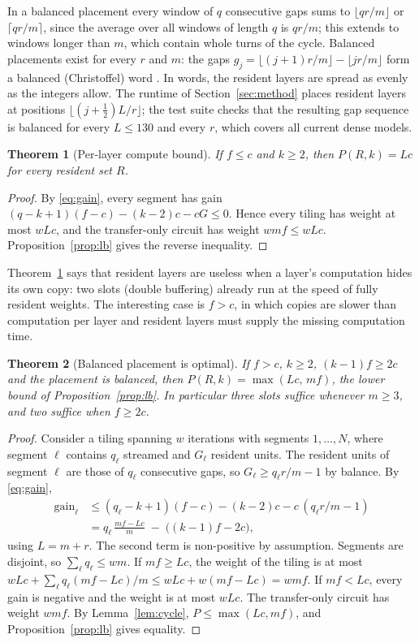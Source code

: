 \documentclass[final,5p,times,twocolumn]{elsarticle}
\newtheorem{theorem}{Theorem}
\theoremstyle{definition}
\newcommand{\Res}{R}
\newcommand{\per}{P}
\begin{document}
In a balanced placement every window of $q$ consecutive gaps sums to $\lfloor qr/m\rfloor$ or $\lceil qr/m\rceil$, since the average over all windows of length $q$ is $qr/m$; this extends to windows longer than $m$, which contain whole turns of the cycle. Balanced placements exist for every $r$ and $m$: the gaps $g_j=\lfloor (j+1)r/m\rfloor-\lfloor jr/m\rfloor$ form a balanced (Christoffel) word \cite[Ch.~2]{lothaire2002algebraic}. In words, the resident layers are spread as evenly as the integers allow. The runtime of Section~\ref{sec:method} places resident layers at positions $\lfloor (j+\frac12)L/r\rfloor$; the test suite checks that the resulting gap sequence is balanced for every $L\le130$ and every $r$, which covers all current dense models.

\begin{theorem}[Per-layer compute bound]\label{thm:compute}
If $f\le c$ and $k\ge2$, then $\per(\Res,k)=Lc$ for every resident set $\Res$.
\end{theorem}
\begin{proof}
By \eqref{eq:gain}, every segment has gain $(q-k+1)(f-c)-(k-2)c-cG\le0$. Hence every tiling has weight at most $wLc$, and the transfer-only circuit has weight $wmf\le wLc$. Proposition~\ref{prop:lb} gives the reverse inequality.
\end{proof}

Theorem~\ref{thm:compute} says that resident layers are useless when a layer's computation hides its own copy: two slots (double buffering) already run at the speed of fully resident weights. The interesting case is $f>c$, in which copies are slower than computation per layer and resident layers must supply the missing computation time.

\begin{theorem}[Balanced placement is optimal]\label{thm:balanced}
If $f>c$, $k\ge 2$, $(k-1)f\ge 2c$ and the placement is balanced, then $\per(\Res,k)=\max(Lc,\,mf)$, the lower bound of Proposition~\ref{prop:lb}. In particular three slots suffice whenever $m\ge3$, and two suffice when $f\ge 2c$.
\end{theorem}
\begin{proof}
Consider a tiling spanning $w$ iterations with segments $1,\dots,N$, where segment $\ell$ contains $q_\ell$ streamed and $G_\ell$ resident units. The resident units of segment $\ell$ are those of $q_\ell$ consecutive gaps, so $G_\ell\ge q_\ell r/m-1$ by balance. By \eqref{eq:gain},
\begin{align*}
\mathrm{gain}_\ell &\le (q_\ell-k+1)(f-c)-(k-2)c-c\,(q_\ell r/m-1)\\
&= q_\ell\,\frac{mf-Lc}{m} \;-\;\bigl((k-1)f-2c\bigr),
\end{align*}
using $L=m+r$. The second term is non-positive by assumption. Segments are disjoint, so $\sum_\ell q_\ell\le wm$. If $mf\ge Lc$, the weight of the tiling is at most $wLc+\sum_\ell q_\ell(mf-Lc)/m\le wLc+w(mf-Lc)=wmf$. If $mf<Lc$, every gain is negative and the weight is at most $wLc$. The transfer-only circuit has weight $wmf$. By Lemma~\ref{lem:cycle}, $\per\le\max(Lc,mf)$, and Proposition~\ref{prop:lb} gives equality.
\end{proof}
\end{document}
